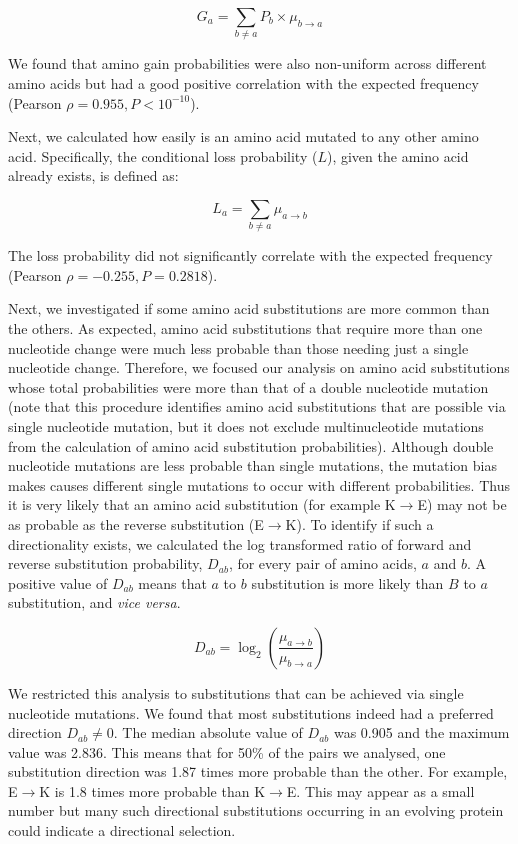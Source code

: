 \documentclass[12pt,a4paper]{article}
\begin{document}
$$G_a = \sum_{b \neq a} P_b \times \mu_{b\to a}$$

We found that amino gain probabilities were also non-uniform across different amino acids but had a good positive correlation with the expected frequency (Pearson $\rho = 0.955, P<10^{-10}$).

Next, we calculated how easily is an amino acid mutated to any other amino acid. Specifically, the conditional loss probability ($L$), given the amino acid already exists, is defined as:

$$L_a = \sum_{b \neq a} \mu_{a\to b}$$

The loss probability did not significantly correlate with the expected frequency (Pearson $\rho = -0.255, P = 0.2818$).

Next, we investigated if some amino acid substitutions are more common than the others. As expected, amino acid substitutions that require more than one nucleotide change were much less probable than those needing just a single nucleotide change. Therefore, we focused our analysis on amino acid substitutions whose total probabilities were more than that of a double nucleotide mutation (note that this procedure identifies amino acid substitutions that are possible via single nucleotide mutation, but it does not exclude multinucleotide mutations from the calculation of amino acid substitution probabilities). Although double nucleotide mutations are less probable than single mutations, the mutation bias makes causes different single mutations to occur with different probabilities. Thus it is very likely that an amino acid substitution (for example K$\to$E) may not be as probable as the reverse substitution (E$\to$K). To identify if such a directionality exists, we calculated the log transformed ratio of forward and reverse substitution probability, $D_{ab}$, for every pair of amino acids, $a$ and $b$. A positive value of $D_{ab}$ means that $a$ to $b$ substitution is more likely than $B$ to $a$ substitution, and \textit{vice versa}.

$$ \textit{D}_{ab} = \log_2\left(\frac{\mu_{a\to b}}{\mu_{b\to a}}\right)$$

We restricted this analysis to substitutions that can be achieved via single nucleotide mutations. We found that most substitutions indeed had a preferred direction $\textit{D}_{ab} \neq 0$. The median absolute value of $\textit{D}_{ab}$ was 0.905 and the maximum value was 2.836. This means that for 50\% of the pairs we analysed, one substitution direction was 1.87 times more probable than the other. For example, E$\to$K is 1.8 times more probable than K$\to$E. This may appear as a small number but many such directional substitutions occurring in an evolving protein could indicate a directional selection. 
\end{document}
